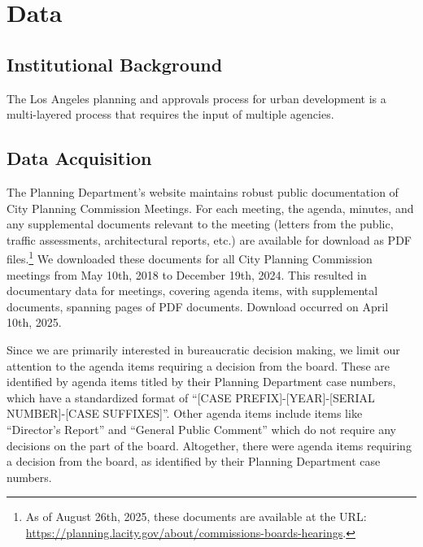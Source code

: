 \section{Data}\label{sec_data}

\subsection{Institutional Background}

The Los Angeles planning and approvals process for urban development is a multi-layered process that requires the input of multiple agencies. 


\subsection{Data Acquisition}

The Planning Department's website maintains robust public documentation of City Planning Commission Meetings. For each meeting, the agenda, minutes, and any supplemental documents relevant to the meeting (letters from the public, traffic assessments, architectural reports, etc.) are available for download as PDF files.\footnote{As of August 26th, 2025, these documents are available at the URL: \url{https://planning.lacity.gov/about/commissions-boards-hearings}.} We downloaded these documents for all City Planning Commission meetings from May 10th, 2018 to December 19th, 2024. This resulted in documentary data for  meetings, covering  agenda items, with  supplemental documents, spanning  pages of PDF documents. Download occurred on April 10th, 2025.

Since we are primarily interested in bureaucratic decision making, we limit our attention to the agenda items requiring a decision from the board. These are identified by agenda items titled by their Planning Department case numbers, which have a standardized format of ``[CASE PREFIX]-[YEAR]-[SERIAL NUMBER]-[CASE SUFFIXES]''. Other agenda items include items like ``Director's Report'' and ``General Public Comment'' which do not require any decisions on the part of the board. Altogether, there were  agenda items requiring a decision from the board, as identified by their Planning Department case numbers.

